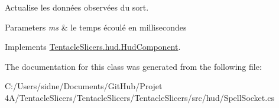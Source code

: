 Actualise les données observées du sort. 


\begin{DoxyParams}{Parameters}
{\em ms} & le temps écoulé en millisecondes \\
\hline
\end{DoxyParams}


Implements \hyperlink{class_tentacle_slicers_1_1hud_1_1_hud_component}{Tentacle\+Slicers.\+hud.\+Hud\+Component}.



The documentation for this class was generated from the following file\+:\begin{DoxyCompactItemize}
\item 
C\+:/\+Users/sidne/\+Documents/\+Git\+Hub/\+Projet 4\+A/\+Tentacle\+Slicers/\+Tentacle\+Slicers/\+Tentacle\+Slicers/src/hud/Spell\+Socket.\+cs\end{DoxyCompactItemize}
